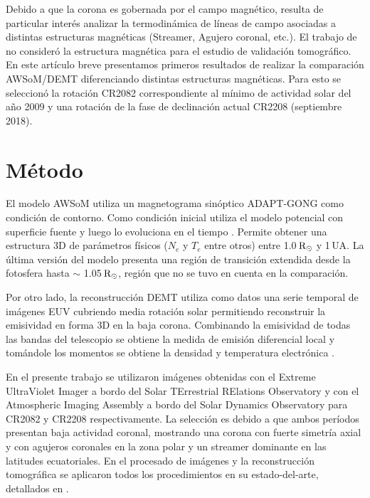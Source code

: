 \documentclass[baaa]{baaa}
\begin{document}
Debido a que la corona es gobernada por el campo magnético, resulta de particular interés analizar la termodinámica de líneas de campo asociadas a distintas estructuras magnéticas (Streamer, Agujero coronal, etc.). El trabajo de \citet{sachdeva_2019} no consideró la estructura magnética para el estudio de validación tomográfico. En este artículo breve presentamos primeros resultados de realizar la comparación AWSoM/DEMT diferenciando distintas estructuras magnéticas. Para esto se seleccionó la rotación CR2082 correspondiente al mínimo de actividad solar del año 2009 y una rotación de la fase de  declinación actual CR2208 (septiembre 2018).


\section{Método}
El modelo AWSoM utiliza un magnetograma sinóptico ADAPT-GONG \citep{arge_2010} como condición de contorno. Como condición inicial utiliza el modelo potencial con superficie fuente y luego lo evoluciona en el tiempo \citep{vander_2010}. Permite obtener una estructura 3D de parámetros físicos ($N_e$ y $T_e$ entre otros) entre 1.0$\,{\rm R_\odot}$ y 1$\,$UA. La última versión del modelo presenta una región de transición extendida desde la fotosfera hasta $\sim$ 1.05$\,{\rm R_\odot}$, región que no se tuvo en cuenta en la comparación.


Por otro lado, la reconstrucción DEMT utiliza como datos una serie temporal de imágenes EUV cubriendo media rotación solar permitiendo reconstruir la emisividad en forma 3D en la baja corona. Combinando la emisividad de todas las bandas del telescopio se obtiene la \rm{medida de emisión diferencial local} y tomándole los momentos se obtiene la densidad y temperatura electrónica \citep{frazin_2009}.  


En el presente trabajo se utilizaron imágenes obtenidas con el Extreme UltraViolet Imager a bordo del Solar TErrestrial RElations Observatory y con el Atmospheric Imaging Assembly a bordo del Solar Dynamics Observatory para CR2082 y CR2208 respectivamente. La selección es debido a que ambos períodos presentan baja actividad coronal, mostrando una corona con fuerte simetría axial y con agujeros coronales en la zona polar y un streamer dominante en las latitudes ecuatoriales. En el procesado de imágenes y la reconstrucción tomográfica se aplicaron todos los procedimientos en su estado-del-arte, detallados en \citet{lloveras_ba2017}.
\end{document}
